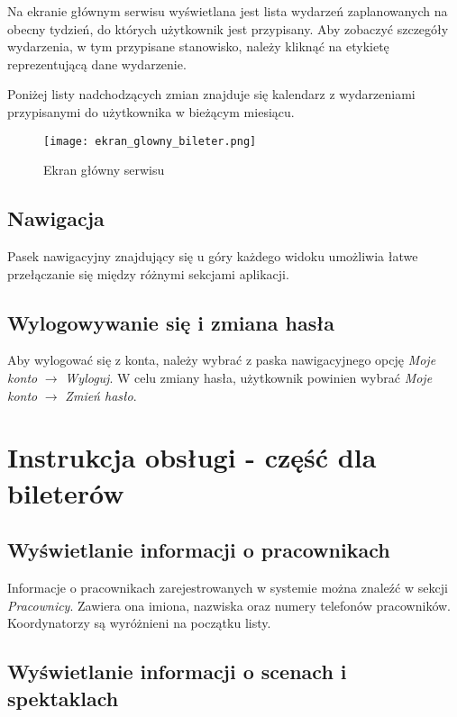 \documentclass[shortabstract]{iithesis}
\begin{document}
Na ekranie głównym serwisu wyświetlana jest lista wydarzeń zaplanowanych na obecny tydzień, do których użytkownik jest przypisany. Aby zobaczyć szczegóły wydarzenia, w tym przypisane stanowisko, należy kliknąć na etykietę reprezentującą dane wydarzenie.

Poniżej listy nadchodzących zmian znajduje się kalendarz z wydarzeniami przypisanymi do użytkownika w bieżącym miesiącu.

\begin{figure}[h!]
    \centering
    \texttt{[image: ekran\_glowny\_bileter.png]}
    \caption{Ekran główny serwisu}
    \label{fig:glowny}
\end{figure}

\subsection{Nawigacja}
Pasek nawigacyjny znajdujący się u góry każdego widoku umożliwia łatwe przełączanie się między różnymi sekcjami aplikacji.

\subsection{Wylogowywanie się i zmiana hasła}
Aby wylogować się z konta, należy wybrać z paska nawigacyjnego opcję \textit{Moje konto} $\rightarrow$ \textit{Wyloguj}.
W celu zmiany hasła, użytkownik powinien wybrać \textit{Moje konto} $\rightarrow$ \textit{Zmień hasło}.

\section{Instrukcja obsługi - część dla bileterów}

\subsection{Wyświetlanie informacji o pracownikach}

Informacje o pracownikach zarejestrowanych w systemie można znaleźć w sekcji \textit{Pracownicy}. Zawiera ona imiona, nazwiska oraz numery telefonów pracowników. Koordynatorzy są wyróżnieni na początku listy.


\subsection{Wyświetlanie informacji o scenach i spektaklach}
\end{document}
